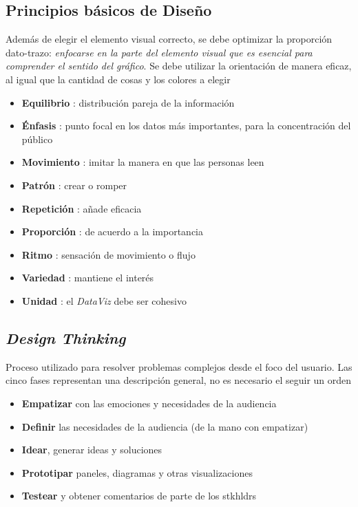 \subsection{Principios básicos de Diseño}
Además de elegir el elemento visual correcto, se debe optimizar la proporción dato-trazo: \textit{enfocarse en la parte del elemento visual que es esencial para comprender el sentido del gráfico}. Se debe utilizar la orientación de manera eficaz, al igual que la cantidad de cosas y los colores a elegir
\begin{itemize}
    \item {\textbf{Equilibrio} : distribución pareja de la información}
    \item {\textbf{Énfasis} : punto focal en los datos más importantes, para la concentración del público}
    \item {\textbf{Movimiento} : imitar la manera en que las personas leen}
    \item {\textbf{Patrón} : crear o romper}
    \item {\textbf{Repetición} : añade eficacia}
    \item {\textbf{Proporción} : de acuerdo a la importancia}
    \item {\textbf{Ritmo} : sensación de movimiento o flujo}
    \item {\textbf{Variedad} : mantiene el interés}
    \item {\textbf{Unidad} : el \textit{DataViz} debe ser cohesivo}
\end{itemize}

\subsection{\textit{Design Thinking}}
Proceso utilizado para resolver problemas complejos desde el foco del usuario. Las cinco fases representan una descripción general, no es necesario el seguir un orden
\begin{itemize}
    \item {\textbf{Empatizar} con las emociones y necesidades de la audiencia}
    \item {\textbf{Definir} las necesidades de la audiencia (de la mano con empatizar)}
    \item {\textbf{Idear}, generar ideas y soluciones} 
    \item {\textbf{Prototipar} paneles, diagramas y otras visualizaciones}
    \item {\textbf{Testear} y obtener comentarios de parte de los \gls{stkhldrs}}
\end{itemize}

\newpage